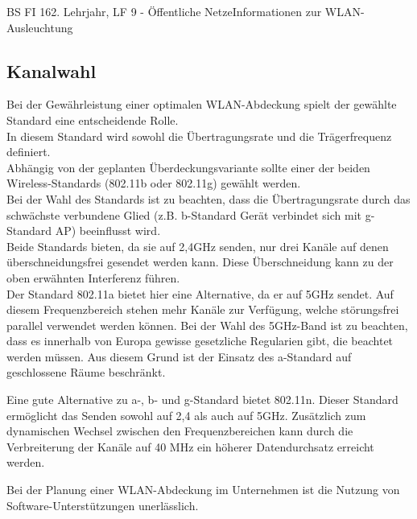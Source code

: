 \documentclass[11pt,twocolumn,oneside,openany,headings=optiontotoc,11pt,numbers=noenddot]{article}
\begin{document}
\begin{worksheet}{BS FI 16}{2. Lehrjahr, LF 9 - Öffentliche Netze}{Informationen zur WLAN-Ausleuchtung}
		\subsection*{Kanalwahl} Bei der Gewährleistung einer optimalen WLAN-Abdeckung spielt der gewählte Standard eine entscheidende Rolle.\\
		In diesem Standard wird sowohl die Übertragungsrate und die Trägerfrequenz definiert.\\
		Abhängig von der geplanten Überdeckungsvariante sollte einer der beiden Wireless-Standards (802.11b oder 802.11g) gewählt werden.\\
		Bei der Wahl des Standards ist zu beachten, dass die Übertragungsrate durch das schwächste verbundene Glied (z.B. b-Standard Gerät verbindet sich mit g-Standard AP) beeinflusst wird.\\
		Beide Standards bieten, da sie auf 2,4GHz senden, nur drei Kanäle auf denen überschneidungsfrei gesendet werden kann. Diese Überschneidung kann zu der oben erwähnten Interferenz führen.\\
		Der Standard 802.11a bietet hier eine Alternative, da er auf 5GHz sendet. Auf diesem Frequenzbereich stehen mehr Kanäle zur Verfügung, welche störungsfrei parallel verwendet werden können. Bei der Wahl des 5GHz-Band ist zu beachten, dass es innerhalb von Europa gewisse gesetzliche Regularien gibt, die beachtet werden müssen. Aus diesem Grund ist der Einsatz des a-Standard auf geschlossene Räume beschränkt.\\
		\par\noindent
		Eine gute Alternative zu a-, b- und g-Standard bietet 802.11n. Dieser Standard ermöglicht das Senden sowohl auf 2,4 als auch auf 5GHz. Zusätzlich zum dynamischen Wechsel zwischen den Frequenzbereichen kann durch die Verbreiterung der Kanäle auf 40 MHz ein höherer Datendurchsatz erreicht werden.\\
		\par\bigskip\noindent
		Bei der Planung einer WLAN-Abdeckung im Unternehmen ist die Nutzung von Software-Unterstützungen unerlässlich.

\end{worksheet}
\end{document}
